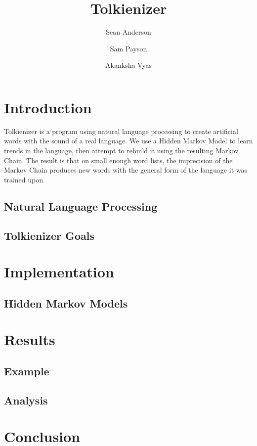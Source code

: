 \documentclass[twocolumn]{article}
\begin{document}
\title{Tolkienizer}
\author{Sean Anderson \and Sam Payson \and Akanksha Vyas}

\section{Introduction}

Tolkienizer is a program using natural language processing to create artificial words with the sound of a real language.  We use a Hidden Markov Model to learn trends in the language, then attempt to rebuild it using the resulting Markov Chain.  The result is that on small enough word lists, the imprecision of the Markov Chain produces new words with the general form of the language it was trained upon.

\subsection{Natural Language Processing}

\subsection{Tolkienizer Goals}

\section{Implementation}

\subsection{Hidden Markov Models}

\section{Results}

\subsection{Example}

\subsection{Analysis}

\section{Conclusion}
\end{document}
